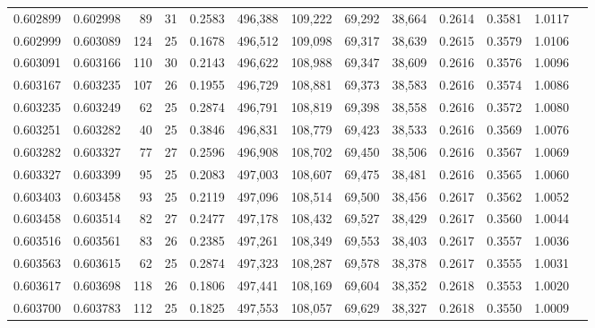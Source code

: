 \begin{tabular}{rrrrrrrrrrrrr}
0.602899 & 0.602998 &  89 &  31 &                                     0.2583 & 496,388 & 109,222 &  69,292 &  38,664 & 0.2614 & 0.3581 & 1.0117 \\
0.602999 & 0.603089 & 124 &  25 &                                     0.1678 & 496,512 & 109,098 &  69,317 &  38,639 & 0.2615 & 0.3579 & 1.0106 \\
0.603091 & 0.603166 & 110 &  30 &                                     0.2143 & 496,622 & 108,988 &  69,347 &  38,609 & 0.2616 & 0.3576 & 1.0096 \\
0.603167 & 0.603235 & 107 &  26 &                                     0.1955 & 496,729 & 108,881 &  69,373 &  38,583 & 0.2616 & 0.3574 & 1.0086 \\
0.603235 & 0.603249 &  62 &  25 &                                     0.2874 & 496,791 & 108,819 &  69,398 &  38,558 & 0.2616 & 0.3572 & 1.0080 \\
0.603251 & 0.603282 &  40 &  25 &                                     0.3846 & 496,831 & 108,779 &  69,423 &  38,533 & 0.2616 & 0.3569 & 1.0076 \\
0.603282 & 0.603327 &  77 &  27 &                                     0.2596 & 496,908 & 108,702 &  69,450 &  38,506 & 0.2616 & 0.3567 & 1.0069 \\
0.603327 & 0.603399 &  95 &  25 &                                     0.2083 & 497,003 & 108,607 &  69,475 &  38,481 & 0.2616 & 0.3565 & 1.0060 \\
0.603403 & 0.603458 &  93 &  25 &                                     0.2119 & 497,096 & 108,514 &  69,500 &  38,456 & 0.2617 & 0.3562 & 1.0052 \\
0.603458 & 0.603514 &  82 &  27 &                                     0.2477 & 497,178 & 108,432 &  69,527 &  38,429 & 0.2617 & 0.3560 & 1.0044 \\
0.603516 & 0.603561 &  83 &  26 &                                     0.2385 & 497,261 & 108,349 &  69,553 &  38,403 & 0.2617 & 0.3557 & 1.0036 \\
0.603563 & 0.603615 &  62 &  25 &                                     0.2874 & 497,323 & 108,287 &  69,578 &  38,378 & 0.2617 & 0.3555 & 1.0031 \\
0.603617 & 0.603698 & 118 &  26 &                                     0.1806 & 497,441 & 108,169 &  69,604 &  38,352 & 0.2618 & 0.3553 & 1.0020 \\
0.603700 & 0.603783 & 112 &  25 &                                     0.1825 & 497,553 & 108,057 &  69,629 &  38,327 & 0.2618 & 0.3550 & 1.0009 \\

\end{tabular}
